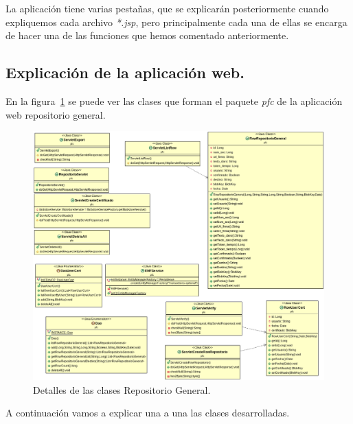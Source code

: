La aplicación tiene varias pestañas, que se explicarán posteriormente cuando expliquemos cada archivo \textit{*.jsp}, pero principalmente cada una de ellas se encarga de hacer una de las funciones que hemos comentado anteriormente.

\subsection{Explicación de la aplicación web.}
En la figura~\ref{fig:clasesReposotorioGeneral} se puede ver las clases que forman el paquete \textit{pfc} de la aplicación web repositorio general.

\begin{figure}

    \includegraphics[scale=0.5]{./GoogleAppEngine/imagenes/UML_repositorio.png}
  \caption{Detalles de las clases Repositorio General.}
  \label{fig:clasesReposotorioGeneral}
\end{figure}

A continuación vamos a explicar una a una las clases desarrolladas.

